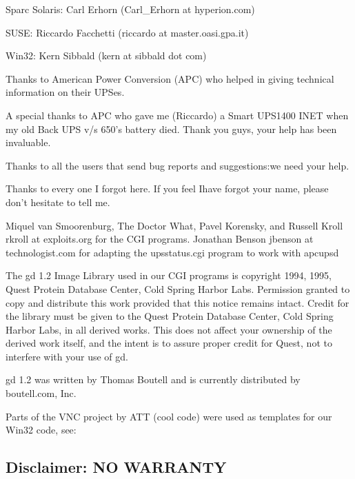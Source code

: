 {{{{{{{{{{{{\begin{description}
Sparc Solaris: Carl Erhorn (Carl\_Erhorn at hyperion.com)  

SUSE: Riccardo Facchetti (riccardo at master.oasi.gpa.it)  

Win32: Kern Sibbald (kern at sibbald dot com)  

\item [Project Discussions:]
\end{description}

Thanks to American Power Conversion (APC) who helped in giving technical
information on their UPSes.  

A special thanks to APC who gave me (Riccardo) a Smart UPS1400 INET when my
old Back UPS v/s 650's battery died.  Thank you guys, your help has been
invaluable.  

Thanks to all the users that send bug reports and suggestions:we need your
help.  

Thanks to every one I forgot here. If you feel Ihave forgot your name, please
don't hesitate to tell me.  

Miquel van Smoorenburg, The Doctor What, Pavel Korensky, and Russell Kroll
\lt{}rkroll at exploits.org\gt{} for the CGI programs. Jonathan Benson
\lt{}jbenson at technologist.com\gt{} for adapting the upsstatus.cgi program
to work with apcupsd  

The gd 1.2 Image Library used in our CGI programs is copyright 1994, 1995,
Quest Protein Database Center, Cold Spring Harbor Labs. Permission granted to
copy and distribute this work provided that this notice remains intact. Credit
for the library must be given to the Quest Protein Database Center, Cold
Spring Harbor Labs, in all derived works. This does not affect your ownership
of the derived work itself, and the intent is to assure proper credit for
Quest, not to interfere with your use of gd.  

gd 1.2 was written by Thomas Boutell and is currently distributed by
boutell.com, Inc.  

Parts of the VNC project by ATT (cool code) were used as templates for our
Win32 code, see: 


\label{Disclaimer_003b-NO-WARRANTY}

\subsection*{Disclaimer: NO WARRANTY}

}}}}}}}}}}}}
